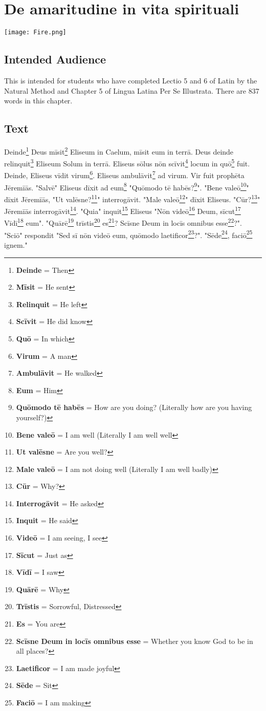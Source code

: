 \chapter{De amaritudine in vita spirituali}
\begin{center}
\texttt{[image: Fire.png]}
\end{center}

\section{Intended Audience}
This is intended for students who have completed Lectio 5 and 6 of Latin by the Natural Method and Chapter 5 of Lingua Latina Per Se Illustrata. There are 837 words in this chapter.

\section{Text}
Deinde\footnote{\textbf{Deinde} = Then} Deus mīsit\footnote{\textbf{Mīsit} = He sent} Eliseum in Caelum, mīsit eum in terrā. Deus deinde relinquit\footnote{\textbf{Relinquit} = He left} Eliseum Solum in terrā. Eliseus sōlus nōn scīvit\footnote{\textbf{Scīvit} = He did know} locum in quō\footnote{\textbf{Quō} = In which} fuit. Deinde, Eliseus vīdit virum\footnote{\textbf{Virum} = A man}. Eliseus ambulāvit\footnote{\textbf{Ambulāvit} = He walked} ad virum. Vir fuit prophēta Jēremīās. "Salvē" Eliseus dīxit ad eum\footnote{\textbf{Eum} = Him} "Quōmodo tē habēs?\footnote{\textbf{Quōmodo tē habēs} = How are you doing? (Literally how are you having yourself?)}". "Bene valeō\footnote{\textbf{Bene valeō} = I am well (Literally I am well well}" dīxit Jēremīās, "Ut valēsne?\footnote{\textbf{Ut valēsne} = Are you well?}" interrogāvit. "Male valeō\footnote{\textbf{Male valeō} = I am not doing well (Literally I am well badly)}" dīxit Eliseus. "Cūr?\footnote{\textbf{Cūr} = Why?}" Jēremīās interrogāvit\footnote{\textbf{Interrogāvit} = He asked}. "Quia" inquit\footnote{\textbf{Inquit} = He said} Eliseus "Nōn videō\footnote{\textbf{Videō} = I am seeing, I see} Deum, sīcut\footnote{\textbf{Sīcut} = Just as} Vīdī\footnote{\textbf{Vīdī} = I saw} eum". "Quārē\footnote{\textbf{Quārē} = Why} trīstis\footnote{\textbf{Trīstis} = Sorrowful, Distressed} es\footnote{\textbf{Es} = You are}? Scīsne Deum in locīs omnibus esse\footnote{\textbf{Scīsne Deum in locīs omnibus esse} = Whether you know God to be in all places?}?". "Sciō" respondit "Sed sī nōn videō eum, quōmodo laetificor\footnote{\textbf{Laetificor} = I am made joyful}?". "Sēde\footnote{\textbf{Sēde} = Sit}, faciō\footnote{\textbf{Faciō} = I am making} ignem." \par 
